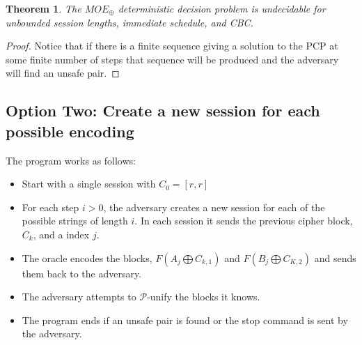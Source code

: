 \documentclass[11pt,twoside,a4paper]{article}
\newtheorem{theorem}{Theorem}
\begin{document}
\begin{theorem}
	The $MOE_{\oplus}$ deterministic decision problem is undecidable for unbounded session lengths, immediate schedule, and CBC.
\end{theorem}
\begin{proof}
	Notice that if there is a finite sequence giving a solution
	to the PCP at some finite number of steps that sequence will
	be produced and the adversary will find an unsafe pair.  
\end{proof}

\subsection{Option Two: Create a new session for each possible
	encoding}

The program works as follows:
\begin{itemize}
	\item Start with a single session with $C_0 = [r,r]$
	\item For each step $i > 0$, the adversary creates
	a new session for each of the possible strings of length 
	$i$. In each session it sends the previous cipher block, $C_k$, and a index $j$.
	\item The oracle encodes the blocks, $F(A_j \bigoplus C_{k, 1})$ and $F(B_j \bigoplus C_{K, 2})$ and sends them back
	to the adversary.
	\item The adversary attempts to $\mathcal{P}$-unify 
	the blocks it knows. 
	\item The program ends if an unsafe pair is found or 
	the stop command is sent by the adversary.  
\end{itemize}
\end{document}

